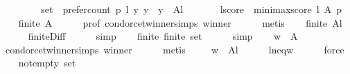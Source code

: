 \begin{isabellebody}
%
\isadelimproof
%
\endisadelimproof
%
\isatagproof
{}\isamarkupfalse%
\ {\isacharminus}{\kern0pt}\isanewline
\ \ \isamarkupfalse%
\isanewline
\ \ \ \ {\isacharquery}{\kern0pt}set\ {\isacharequal}{\kern0pt}\ {\isachardoublequoteopen}{\isacharbraceleft}{\kern0pt}prefer{\isacharunderscore}{\kern0pt}count\ p\ l\ y\ {\isacharbar}{\kern0pt}y\ {\isachardot}{\kern0pt}\ y\ {\isasymin}\ A{\isacharminus}{\kern0pt}{\isacharbraceleft}{\kern0pt}l{\isacharbraceright}{\kern0pt}{\isacharbraceright}{\kern0pt}{\isachardoublequoteclose}\ \isanewline
\ \ \ \ \ \ {\isacharquery}{\kern0pt}lscore\ {\isacharequal}{\kern0pt}\ {\isachardoublequoteopen}minimax{\isacharunderscore}{\kern0pt}score\ l\ A\ p{\isachardoublequoteclose}\isanewline
\ \ \isamarkupfalse%
\ {\isachardoublequoteopen}finite\ A{\isachardoublequoteclose}\isanewline
\ \ \ \ \isamarkupfalse%
\ prof\ condorcet{\isacharunderscore}{\kern0pt}winner{\isachardot}{\kern0pt}simps\ winner\isanewline
\ \ \ \ \isamarkupfalse%
\ metis\isanewline
\ \ \isamarkupfalse%
\ {\isachardoublequoteopen}finite\ {\isacharparenleft}{\kern0pt}A{\isacharminus}{\kern0pt}{\isacharbraceleft}{\kern0pt}l{\isacharbraceright}{\kern0pt}{\isacharparenright}{\kern0pt}{\isachardoublequoteclose}\isanewline
\ \ \ \ \isamarkupfalse%
\ finite{\isacharunderscore}{\kern0pt}Diff\isanewline
\ \ \ \ \isamarkupfalse%
\ simp\isanewline
\ \ \isamarkupfalse%
\ finite{\isacharcolon}{\kern0pt}\ {\isachardoublequoteopen}finite\ {\isacharquery}{\kern0pt}set{\isachardoublequoteclose}\isanewline
\ \ \ \ \isamarkupfalse%
\ simp\isanewline
\ \ \isamarkupfalse%
\ {\isachardoublequoteopen}w\ {\isasymin}\ A{\isachardoublequoteclose}\isanewline
\ \ \ \ \isamarkupfalse%
\ condorcet{\isacharunderscore}{\kern0pt}winner{\isachardot}{\kern0pt}simps\ winner\isanewline
\ \ \ \ \isamarkupfalse%
\ metis\isanewline
\ \ \isamarkupfalse%
\ {}{\isacharcolon}{\kern0pt}\ {\isachardoublequoteopen}w\ {\isasymin}\ A{\isacharminus}{\kern0pt}{\isacharbraceleft}{\kern0pt}l{\isacharbraceright}{\kern0pt}{\isachardoublequoteclose}\isanewline
\ \ \ \ \isamarkupfalse%
\ l{\isacharunderscore}{\kern0pt}neq{\isacharunderscore}{\kern0pt}w\isanewline
\ \ \ \ \isamarkupfalse%
\ force\isanewline
\ \ \isamarkupfalse%
\ not{\isacharunderscore}{\kern0pt}empty{\isacharcolon}{\kern0pt}\ {\isachardoublequoteopen}{\isacharquery}{\kern0pt}set\ {\isasymnoteq}\ {\isacharbraceleft}{\kern0pt}{\isacharbraceright}{\kern0pt}{\isachardoublequoteclose}\isanewline

\end{isabellebody}

